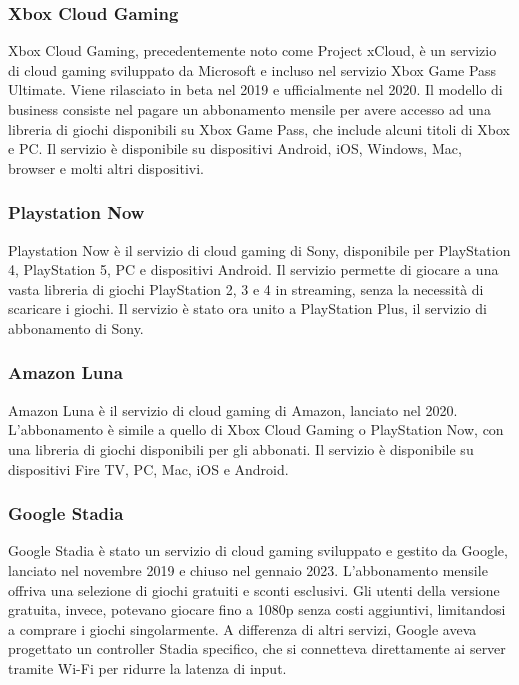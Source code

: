 \documentclass[12pt,a4paper,openright,twoside]{book}
\begin{document}
\subsubsection{Xbox Cloud Gaming}
Xbox Cloud Gaming, precedentemente noto come Project xCloud, è un servizio di cloud gaming sviluppato da Microsoft e incluso nel servizio Xbox Game Pass Ultimate. Viene rilasciato in beta nel 2019 e ufficialmente nel 2020. Il modello di business consiste nel pagare un abbonamento mensile per avere accesso ad una libreria di giochi disponibili su Xbox Game Pass, che include alcuni titoli di Xbox e PC. Il servizio è disponibile su dispositivi Android, iOS, Windows, Mac, browser e molti altri dispositivi.

\subsubsection{Playstation Now}
Playstation Now è il servizio di cloud gaming di Sony, disponibile per PlayStation 4, PlayStation 5, PC e dispositivi Android. Il servizio permette di giocare a una vasta libreria di giochi PlayStation 2, 3 e 4 in streaming, senza la necessità di scaricare i giochi. Il servizio è stato ora unito a PlayStation Plus, il servizio di abbonamento di Sony.

\subsubsection{Amazon Luna}
Amazon Luna è il servizio di cloud gaming di Amazon, lanciato nel 2020. L'abbonamento è simile a quello di Xbox Cloud Gaming o PlayStation Now, con una libreria di giochi disponibili per gli abbonati. Il servizio è disponibile su dispositivi Fire TV, PC, Mac, iOS e Android.

\subsubsection{Google Stadia}
Google Stadia è stato un servizio di cloud gaming sviluppato e gestito da Google, lanciato nel novembre 2019 e chiuso nel gennaio 2023. L'abbonamento mensile offriva una selezione di giochi gratuiti e sconti esclusivi. Gli utenti della versione gratuita, invece, potevano giocare fino a 1080p senza costi aggiuntivi, limitandosi a comprare i giochi singolarmente.
A differenza di altri servizi, Google aveva progettato un controller Stadia specifico, che si connetteva direttamente ai server tramite Wi-Fi per ridurre la latenza di input.
\end{document}
